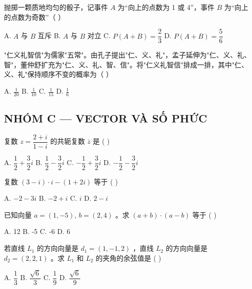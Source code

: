 \documentclass[11pt, a4paper]{article}
\begin{document}
\begin{baitap}[18]
抛掷一颗质地均匀的骰子，记事件 $A$ 为“向上的点数为 1 或 4”，事件 $B$ 为“向上的点数为奇数”（ ）
\par\vspace{3pt}
\noindent A. $A$ 与 $B$ 互斥 \quad B. $A$ 与 $B$ 对立 \quad C. $P(A + B) = \dfrac{2}{3}$ \quad D. $P(A + B) = \dfrac{5}{6}$
\end{baitap}

\begin{baitap}[19]
"仁义礼智信"为儒家"五常"。由孔子提出"仁、义、礼"，孟子延伸为"仁、义、礼、智"，董仲舒扩充为"仁、义、礼、智、信"。将"仁义礼智信"排成一排，其中"仁、义、礼"保持顺序不变的概率为（ ）
\par\vspace{3pt}
\noindent A. $\frac{1}{20}$ \quad B. $\frac{1}{10}$ \quad C. $\frac{1}{15}$ \quad D. $\frac{1}{6}$
\end{baitap}

\subsection*{NHÓM C — VECTOR VÀ SỐ PHỨC}

\begin{baitap}[20]
复数 $z = \dfrac{2+i}{1-i}$ 的共轭复数 $\overline{z}$ 是 ( )
\par\vspace{3pt}
\noindent A. $\dfrac{1}{2} + \dfrac{3}{2}i$ \quad B. $\dfrac{1}{2} - \dfrac{3}{2}i$ \quad C. $-\dfrac{1}{2} + \dfrac{3}{2}i$ \quad D. $-\dfrac{1}{2} - \dfrac{3}{2}i$
\end{baitap}

\begin{baitap}[21]
复数 $(3 - i) \cdot i - (1 + 2i)$ 等于 ( )
\par\vspace{3pt}
\noindent A. $-2 - 3i$ \quad B. $-2 + i$ \quad C. $i$ \quad D. $2 - i$
\end{baitap}

\begin{baitap}[22]
已知向量 $a = (1, -5)$, $b = (2,4)$ 。求 $(a + b) \cdot (a - b)$ 等于 ( )
\par\vspace{3pt}
\noindent A. 12 \quad B. -5 \quad C. -6 \quad D. 6
\end{baitap}

\begin{baitap}[23]
若直线 $L_1$ 的方向向量是 $d_1 = (1,-1,2)$ ，直线 $L_2$ 的方向向量是 $d_2 = (2,2,1)$ 。求 $L_1$ 和 $L_2$ 的夹角的余弦值是 ( )
\par\vspace{3pt}
\noindent A. $\dfrac{1}{3}$ \quad B. $\dfrac{\sqrt{6}}{3}$ \quad C. $\dfrac{1}{9}$ \quad D. $\dfrac{\sqrt{6}}{9}$
\end{baitap}
\end{document}
